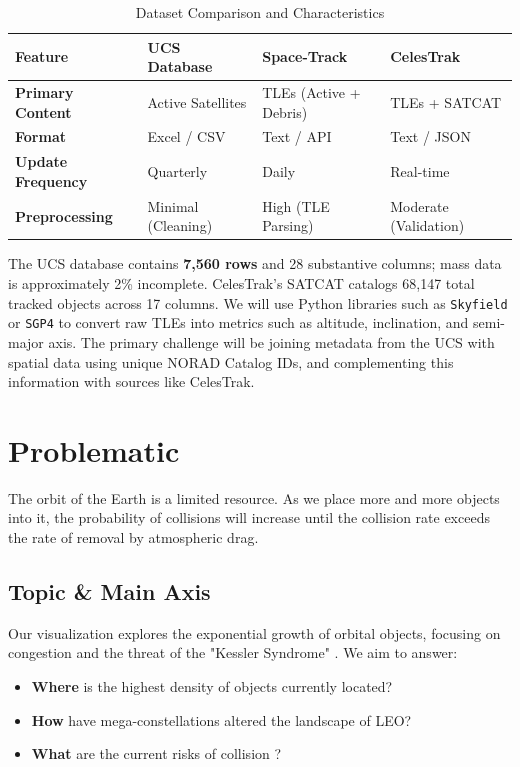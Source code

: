 \begin{table}[H]
    \centering
    \caption{Dataset Comparison and Characteristics}
    \label{tab:datasets}
    \begin{tabular}{@{}llll@{}} \toprule
        Feature & UCS Database & Space-Track & CelesTrak \\ \midrule
        \textbf{Primary Content} & Active Satellites & TLEs (Active + Debris) & TLEs + SATCAT \\
        \textbf{Format} & Excel / CSV & Text / API & Text / JSON \\
        \textbf{Update Frequency} & Quarterly & Daily & Real-time \\
        \textbf{Preprocessing} & Minimal (Cleaning) & High (TLE Parsing) & Moderate (Validation) \\ \bottomrule
    \end{tabular}
\end{table}

The UCS database contains \textbf{7,560 rows} and 28 substantive columns; mass data is approximately 2\% incomplete. CelesTrak's SATCAT catalogs 68,147 total tracked objects across 17 columns. We will use Python libraries such as \texttt{Skyfield} or \texttt{SGP4} to convert raw TLEs into metrics such as altitude, inclination, and semi-major axis. The primary challenge will be joining metadata from the UCS with spatial data using unique NORAD Catalog IDs, and complementing this information with sources like CelesTrak.

\section{Problematic}

\begin{fquote}
    The orbit of the Earth is a limited resource. As we place more and more objects into it, the probability of collisions will increase until the collision rate exceeds the rate of removal by atmospheric drag.
\end{fquote}

\subsection{Topic \& Main Axis}
Our visualization explores the exponential growth of orbital objects, focusing on congestion and the threat of the "Kessler Syndrome" \cite{kessler-syndrome}. We aim to answer:
\begin{itemize}
    \item \textbf{Where} is the highest density of objects currently located?
    \item \textbf{How} have mega-constellations altered the landscape of LEO?
    \item \textbf{What} are the current risks of collision ?
\end{itemize}

